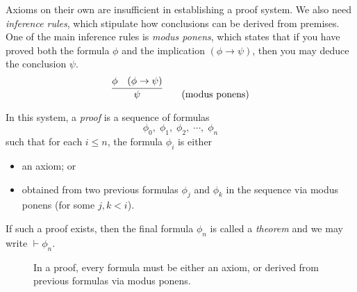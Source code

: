 Axioms on their own are insufficient in establishing a proof system. We also need \emph{inference rules}, which stipulate how conclusions can be derived from premises. One of the main inference rules is \emph{modus ponens}, which states that if you have proved both the formula \(\phi\) and the implication \((\phi\rightarrow\psi)\), then you may deduce the conclusion \(\psi\).
%
\[
    \infer{\psi}{
        \phi
        &
        (\phi\rightarrow\psi)
    }
    \tag{modus ponens}
\]

In this system, a \emph{proof} is a sequence of formulas
%
\[\phi_0,\; \phi_1,\; \phi_2,\; \cdots,\; \phi_n\]
%
such that for each \(i \leq n\), the formula \(\phi_i\) is either
%
\begin{itemize}
    \item an axiom; or
    \item obtained from two previous formulas \(\phi_j\) and \(\phi_k\) in the sequence via modus ponens (for some \(j, k < i\)).
\end{itemize}
%
If such a proof exists, then the final formula \(\phi_n\) is called a \emph{theorem} and we may write \(\vdash \phi_n\).

\begin{figure}[H]
    \centering
    \caption{In a proof, every formula must be either an axiom, or derived from previous formulas via modus ponens.}
    \label{fig:Ch02-proof}
\end{figure}


